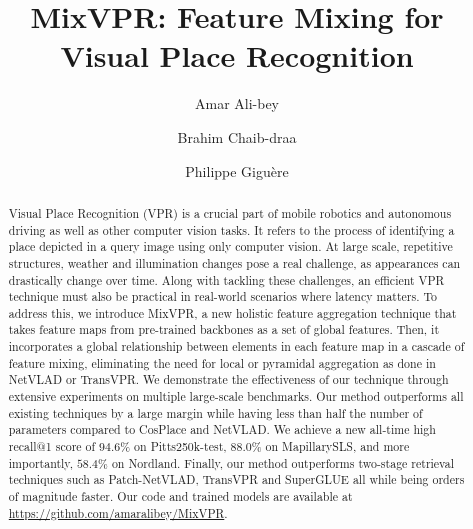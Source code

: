 \documentclass[10pt,twocolumn,letterpaper]{article}
\begin{document}
\title{MixVPR: Feature Mixing for Visual Place Recognition}

\author[]{Amar Ali-bey}
\author[]{Brahim Chaib-draa}
\author[]{Philippe Gigu\`ere}




\maketitle
\thispagestyle{empty}

\begin{abstract}
Visual Place Recognition (VPR) is a crucial part of mobile robotics and autonomous driving as well as other computer vision tasks. It refers to the process of identifying a place depicted in a query image using only computer vision. At large scale, repetitive structures, weather and illumination changes pose a real challenge, as appearances can drastically change over time. Along with tackling these challenges, an efficient VPR technique must also be practical in real-world scenarios where latency matters.
To address this, we introduce MixVPR, a new holistic feature aggregation technique that takes feature maps from pre-trained backbones as a set of global features. Then, it incorporates a global relationship between elements in each feature map in a cascade of feature mixing, eliminating the need for local or pyramidal aggregation as done in NetVLAD or TransVPR. We demonstrate the effectiveness of our technique through extensive experiments on multiple large-scale benchmarks. Our method outperforms all existing techniques by a large margin while having less than half the number of parameters compared to CosPlace and NetVLAD. We achieve a new all-time high recall@1 score of $94.6\%$ on \mbox{Pitts250k-test}, $88.0\%$ on MapillarySLS, and more importantly, $58.4\%$ on Nordland. 
Finally, our method outperforms two-stage retrieval techniques such as \mbox{Patch-NetVLAD}, TransVPR and SuperGLUE all while being orders of magnitude faster. Our code and trained models are available at \mbox{\url{https://github.com/amaralibey/MixVPR}.}

\end{abstract}
\end{document}
